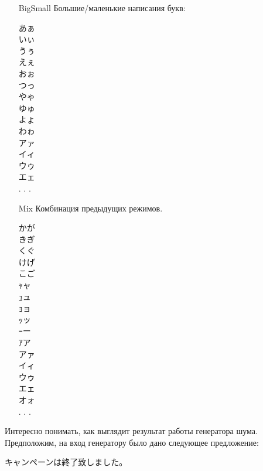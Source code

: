 \begin{itemize}
	\item[BigSmall] Большие/маленькие написания букв:
	
	\begin{multicols}{3}
	\begin{CJK}{UTF8}{min}
		あぁ \\
		いぃ\\
		うぅ\\
		えぇ\\
		おぉ\\
		つっ\\
		やゃ\\
		ゆゅ\\
		よょ\\
		わゎ\\
		アァ\\
		イィ\\
		ウゥ\\
		エェ\\
		. . . \end{CJK}
\end{multicols}

	\item[Mix] Комбинация предыдущих режимов.
		\begin{multicols}{3}
		\begin{CJK}{UTF8}{min}
			かが \\
			きぎ \\
			くぐ \\
			けげ \\
			こご \\
			ｬャ\\
			ｭュ\\
			ｮョ\\
			ｯッ\\
			ｰー\\
			ｱア\\
			アァ\\
			イィ\\
			ウゥ\\
			エェ\\
			オォ \\
		. . . \end{CJK}
	\end{multicols}
	
\end{itemize}

Интересно понимать, как выглядит результат работы генератора шума.
Предположим, на вход генератору было дано следующее предложение:

\begin{CJK}{UTF8}{min}キャンペーンは終了致しました。 \end{CJK} 

